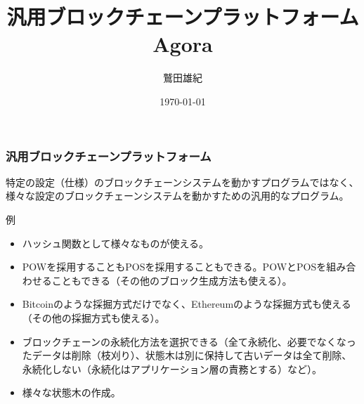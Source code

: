 \documentclass[dvipdfmx,9pt,notheorems]{beamer}
\title[汎用ブロックチェーンプラットフォームAgora]{\fontsize{20pt}{0pt}\selectfont 汎用ブロックチェーンプラットフォームAgora}
\author[名前]{\fontsize{15pt}{0pt}\selectfont 鷲田雄紀}
\institute[JPN]{\fontsize{10pt}{0pt}\selectfont AIHソフト}
\date{\fontsize{15pt}{0pt}\selectfont \today}
\theoremstyle{definition}
\begin{document}
\begin{frame}[plain]\frametitle{}
\titlepage %
\end{frame}



\begin{frame}\frametitle{汎用ブロックチェーンプラットフォーム}
特定の設定（仕様）のブロックチェーンシステムを動かすプログラムではなく、様々な設定のブロックチェーンシステムを動かすための汎用的なプログラム。
\begin{block}{例}
\begin{itemize}
 \item ハッシュ関数として様々なものが使える。
 \item POWを採用することもPOSを採用することもできる。POWとPOSを組み合わせることもできる（その他のブロック生成方法も使える）。
 \item Bitcoinのような採掘方式だけでなく、Ethereumのような採掘方式も使える（その他の採掘方式も使える）。
 \item ブロックチェーンの永続化方法を選択できる（全て永続化、必要でなくなったデータは削除（枝刈り）、状態木は別に保持して古いデータは全て削除、永続化しない（永続化はアプリケーション層の責務とする）など）。
 \item 様々な状態木の作成。
\end{itemize}
\end{block}
\end{frame}
\end{document}
